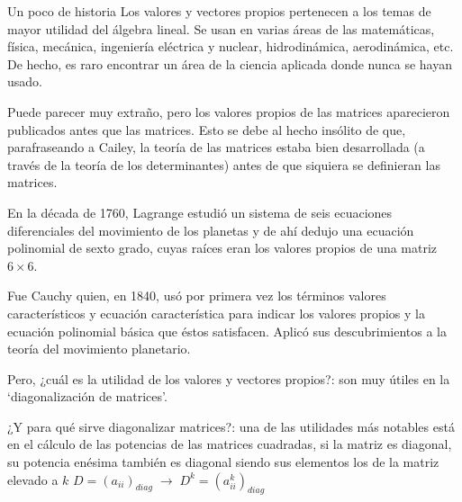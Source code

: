 \begin{myexampleblock}{Un poco de historia}
Los valores y vectores propios pertenecen a los temas de mayor utilidad del álgebra lineal. Se usan en varias áreas de las matemáticas, física, mecánica, ingeniería eléctrica y nuclear, hidrodinámica, aerodinámica, etc. De hecho, es raro encontrar un área de la ciencia aplicada donde nunca se hayan usado. 

\vspace {2mm} Puede parecer muy extraño, pero los valores propios de las matrices aparecieron publicados antes que las matrices. Esto se debe al hecho insólito de que, parafraseando a Cailey, la teoría de las matrices estaba bien desarrollada (a través de la teoría de los determinantes) antes de que siquiera se definieran las matrices.  

\vspace {2mm}  En la década de 1760, Lagrange estudió un sistema de seis ecuaciones diferenciales del movimiento de los planetas y de ahí dedujo una ecuación polinomial de sexto grado, cuyas raíces eran los valores propios de una matriz $6 \times 6$. 

\vspace {2mm} Fue Cauchy quien, en 1840, usó por primera vez los términos valores característicos y ecuación característica para indicar los valores propios y la ecuación polinomial básica que éstos satisfacen. Aplicó sus descubrimientos a la teoría del movimiento planetario.	

\vspace {2mm} Pero, ¿cuál es la utilidad de los valores y vectores propios?: son muy útiles en la `diagonalización de matrices'.

\vspace {2mm} ¿Y para qué sirve diagonalizar matrices?: una de las utilidades más notables está en el cálculo de las potencias de las matrices cuadradas, si la matriz es diagonal, su potencia enésima también es diagonal siendo sus elementos los de la matriz elevado a $k$ \textcolor{gris}{$D=(a_{ii})_{diag} 	\; \to \; D^k=(a^k_{ii})_{diag}$}
\end{myexampleblock}


		
%
%


